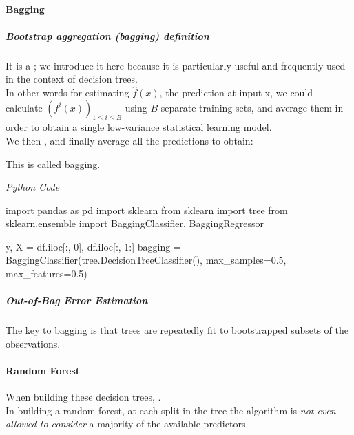 \paragraph{Bagging}
\subparagraph{Bootstrap aggregation (bagging) definition}
It is a ; we introduce it here because it is
particularly useful and frequently used in the context of decision
trees.\\
In other words for estimating $\hat{f}(x)$, the prediction at input x, we could calculate $\left(f^{i
}(x)\right)_{1\leq i\leq B}$ using $B$ separate training sets, and average them in order to
obtain a single low-variance statistical learning model.\\
We then , and finally average all the predictions
to obtain:
\begin{center}
\end{center}
This is called bagging.

\emph{Python Code}
\begin{python}
import pandas as pd
import sklearn
from sklearn import tree
from sklearn.ensemble import BaggingClassifier,
    BaggingRegressor

y, X = df.iloc[:, 0], df.iloc[:, 1:]
bagging = BaggingClassifier(tree.DecisionTreeClassifier(),
    max_samples=0.5, max_features=0.5)
\end{python}

\subparagraph{Out-of-Bag Error Estimation}
The key to bagging is that trees are repeatedly fit to bootstrapped subsets of the observations.

\paragraph{Random Forest}
When building these decision trees, .\\
In building a random forest, at each split in the tree the algorithm
is \emph{not even allowed to consider} a majority of the available
predictors.

